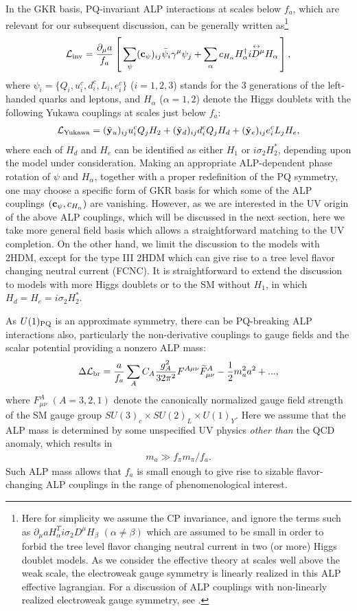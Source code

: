 \documentclass[preprint,prd,aps,tighten,nofootinbib,amssymb]{revtex4}
\newcommand{\bea}{\begin{eqnarray}}
\newcommand{\eea}{\end{eqnarray}}
\newcommand{\dis}[1]{\begin{equation}\begin{split}#1\end{split}\end{equation}}
\def\vpq{f_{a}}
\newcommand{\C}{\bold c}
\newcommand{\Y}{\tilde{\bold  y}}
\begin{document}
In the GKR basis, PQ-invariant ALP interactions at scales below  $\vpq$, which are relevant for our subsequent discussion, can be generally written as\footnote{Here for simplicity we assume the CP invariance, and ignore the terms such as  $\partial_\mu a H_\alpha^Ti\sigma_2 D^\mu H_\beta$ $(\alpha\neq \beta)$ which are assumed to be small in order to forbid the tree level flavor changing neutral current in two (or more) Higgs doublet models. As we consider the effective theory at scales  well above the weak scale, the electroweak gauge symmetry is linearly realized in this ALP effective lagrangian. For a discussion of ALP couplings with non-linearly realized electroweak gauge symmetry, see \cite{Brivio:2017ije}.} 
\dis{
\label{coup_sm}
 {\cal L}_{\rm inv}=\frac{\partial_\mu a}{\vpq}\left[\,\sum_{\psi} (\C_\psi)_{ij} \bar\psi_i \gamma^\mu \psi_j
 +\sum_\alpha c_{H_\alpha}H_\alpha^\dagger\overset{\leftrightarrow}{i D^\mu} H_\alpha\,\right],
}
where $\psi_i=\{Q_i, u^c_i,d^c_i,  L_i, e^c_i\}$ ($i=1,2,3$) stands for the 3 generations of the left-handed quarks and leptons,  and  $H_\alpha$ ($\alpha=1,2$) denote the Higgs doublets with the following Yukawa couplings at scales just below $\vpq$:
\dis{
\label{yukawa_2hdm}
{\cal L}_{\rm Yukawa}=(\Y_u)_{ij} {u^c_i}  Q_{j} H_2 + (\Y_d)_{ij}  {d^c_i} Q_{j} H_d + (\Y_e)_{ij} {e^c_i}  L_j H_e,
}
where each of $H_d$ and $H_e$ can be identified as either $H_1$ or $i \sigma_2 H_2^*$, depending upon the model under consideration.
Making an appropriate ALP-dependent phase rotation of $\psi$ and $H_\alpha$, together with a proper redefinition of the PQ symmetry, one may choose a specific form of GKR  basis for which some of the ALP couplings $(\C_\psi, c_{H_\alpha})$  are vanishing.
However, as we are interested in the UV origin of the above ALP couplings, which will be discussed in the next section, here we take more general field basis which allows a straightforward matching to the UV completion. 
On the other hand,  we limit the discussion to the models with 2HDM, except for the type III 2HDM which can give rise to a tree level flavor changing neutral current (FCNC).
It is straightforward to extend the discussion to models with more Higgs doublets or to the SM without $H_1$, in which $H_d = H_e = i \sigma_2 H_2^*$. 

As $U(1)_{\rm PQ}$ is an approximate symmetry, there can be PQ-breaking ALP interactions also, particularly the non-derivative couplings to gauge fields  and the scalar potential providing a nonzero ALP mass:
\bea
\label{coup_br}
 \Delta {\cal L}_{\rm br}=\frac{a}{\vpq} \sum_{A} C_A \frac{g_A^2}{32 \pi^2} F^{A \mu \nu} \widetilde{F}^A_{\mu \nu}-\frac{1}{2}m_a^2 a^2+...,
 \eea
 where $F^A_{\mu\nu}$ $(A=3,2,1)$ denote the canonically normalized gauge field strength of the SM gauge group $SU(3)_c\times SU(2)_L\times U(1)_Y$.
Here we assume that the ALP mass  is determined by some unspecified UV physics {\it other than} the QCD anomaly, which results in 
\bea
m_a \gg f_\pi m_\pi /f_a.
\eea
Such ALP mass allows that  $f_a$ is small enough to give rise to sizable flavor-changing ALP couplings in the range of phenomenological interest.
\end{document}
